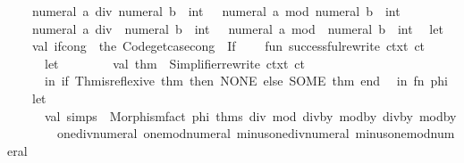 \begin{isabellebody}
\ \ \ {\isachardoublequoteopen}{\isacharminus}{\kern0pt}\ numeral\ a\ div\ numeral\ b\ {\isacharcolon}{\kern0pt}{\isacharcolon}{\kern0pt}\ int{\isachardoublequoteclose}\ {\isacharbar}{\kern0pt}\ {\isachardoublequoteopen}{\isacharminus}{\kern0pt}\ numeral\ a\ mod\ numeral\ b\ {\isacharcolon}{\kern0pt}{\isacharcolon}{\kern0pt}\ int{\isachardoublequoteclose}\ {\isacharbar}{\kern0pt}\isanewline
\ \ \ {\isachardoublequoteopen}{\isacharminus}{\kern0pt}\ numeral\ a\ div\ {\isacharminus}{\kern0pt}\ numeral\ b\ {\isacharcolon}{\kern0pt}{\isacharcolon}{\kern0pt}\ int{\isachardoublequoteclose}\ {\isacharbar}{\kern0pt}\ {\isachardoublequoteopen}{\isacharminus}{\kern0pt}\ numeral\ a\ mod\ {\isacharminus}{\kern0pt}\ numeral\ b\ {\isacharcolon}{\kern0pt}{\isacharcolon}{\kern0pt}\ int{\isachardoublequoteclose}{\isacharparenright}{\kern0pt}\ {\isacharequal}{\kern0pt}\isanewline
{\isacartoucheopen}\ let\isanewline
\ \ \ \ val\ if{\isacharunderscore}{\kern0pt}cong\ {\isacharequal}{\kern0pt}\ the\ {\isacharparenleft}{\kern0pt}Code{\isachardot}{\kern0pt}get{\isacharunderscore}{\kern0pt}case{\isacharunderscore}{\kern0pt}cong\ \isactrltheory \ \isactrlconstUNDERSCOREname {\isasymopen}If{\isasymclose}{\isacharparenright}{\kern0pt}{\isacharsemicolon}{\kern0pt}\isanewline
\ \ \ \ fun\ successful{\isacharunderscore}{\kern0pt}rewrite\ ctxt\ ct\ {\isacharequal}{\kern0pt}\isanewline
\ \ \ \ \ \ let\isanewline
\ \ \ \ \ \ \ \ val\ thm\ {\isacharequal}{\kern0pt}\ Simplifier{\isachardot}{\kern0pt}rewrite\ ctxt\ ct\isanewline
\ \ \ \ \ \ in\ if\ Thm{\isachardot}{\kern0pt}is{\isacharunderscore}{\kern0pt}reflexive\ thm\ then\ NONE\ else\ SOME\ thm\ end{\isacharsemicolon}{\kern0pt}\isanewline
\ \ in\ fn\ phi\ {\isacharequal}{\kern0pt}{\isachargreater}{\kern0pt}\isanewline
\ \ \ \ let\isanewline
\ \ \ \ \ \ val\ simps\ {\isacharequal}{\kern0pt}\ Morphism{\isachardot}{\kern0pt}fact\ phi\ {\isacharparenleft}{\kern0pt}{\isacharat}{\kern0pt}{\isacharbraceleft}{\kern0pt}thms\ div{\isacharunderscore}{\kern0pt}{}\ mod{\isacharunderscore}{\kern0pt}{}\ div{\isacharunderscore}{\kern0pt}by{\isacharunderscore}{\kern0pt}{}\ mod{\isacharunderscore}{\kern0pt}by{\isacharunderscore}{\kern0pt}{}\ div{\isacharunderscore}{\kern0pt}by{\isacharunderscore}{\kern0pt}{}\ mod{\isacharunderscore}{\kern0pt}by{\isacharunderscore}{\kern0pt}{}\isanewline
\ \ \ \ \ \ \ \ one{\isacharunderscore}{\kern0pt}div{\isacharunderscore}{\kern0pt}numeral\ one{\isacharunderscore}{\kern0pt}mod{\isacharunderscore}{\kern0pt}numeral\ minus{\isacharunderscore}{\kern0pt}one{\isacharunderscore}{\kern0pt}div{\isacharunderscore}{\kern0pt}numeral\ minus{\isacharunderscore}{\kern0pt}one{\isacharunderscore}{\kern0pt}mod{\isacharunderscore}{\kern0pt}numeral\isanewline

\end{isabellebody}
